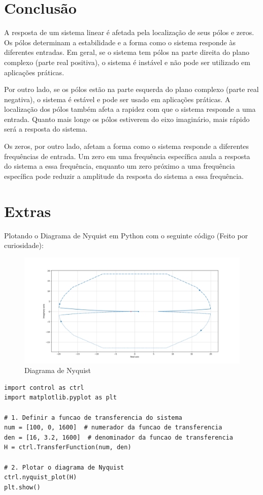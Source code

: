 \documentclass[10pt]{article}
\begin{document}
\newpage

\section{Conclusão}

\quad A resposta de um sistema linear é afetada pela localização de seus pólos e zeros.
Os pólos determinam a estabilidade e a forma como o sistema responde às diferentes entradas.
Em geral, se o sistema tem pólos na parte direita do plano complexo (parte real positiva), o sistema é instável e não pode ser utilizado em aplicações práticas.

\quad Por outro lado, se os pólos estão na parte esquerda do plano complexo (parte real negativa), o sistema é estável e pode ser usado em aplicações práticas.
A localização dos pólos também afeta a rapidez com que o sistema responde a uma entrada.
Quanto mais longe os pólos estiverem do eixo imaginário, mais rápido será a resposta do sistema.

\quad Os zeros, por outro lado, afetam a forma como o sistema responde a diferentes frequências de entrada.
Um zero em uma frequência específica anula a resposta do sistema a essa frequência,
enquanto um zero próximo a uma frequência específica pode reduzir a amplitude da resposta do sistema a essa frequência.

\newpage

\section{Extras}

\quad Plotando o Diagrama de Nyquist em Python com o seguinte código (Feito por curiosidade):

\begin{figure}[h]
    \centering
    \includegraphics[scale=0.45]{nyquist.png}
    \caption{Diagrama de Nyquist}
\end{figure}

\begin{lstlisting}
import control as ctrl
import matplotlib.pyplot as plt

# 1. Definir a funcao de transferencia do sistema
num = [100, 0, 1600]  # numerador da funcao de transferencia
den = [16, 3.2, 1600]  # denominador da funcao de transferencia
H = ctrl.TransferFunction(num, den)

# 2. Plotar o diagrama de Nyquist
ctrl.nyquist_plot(H)
plt.show()
\end{lstlisting}
\end{document}
